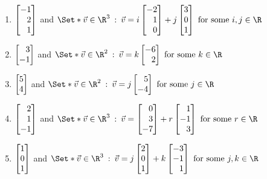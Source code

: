 \begin{exercises}
\begin{problist}
\begin{enumerate}
				\item $\mat{-1 \\ 2 \\ 1}$ and
					$\Set*{\vv\in\R^3\given
						\vv=i\mat{-2 \\ 1 \\ 0} +j\mat{3 \\ 0 \\ 1}
						\text{ for some }i,j\in\R
					}$
					\item
						$\mat{3 \\ -1}$ and $\Set*{ \vv\in\R^2\given
							\vv=k\mat{-6 \\ 2}\text{ for some } k\in\R
						}$
					\item
						$\mat{5 \\ 4}$ and
						$\Set*{\vv\in\R^2\given
							\vv=j\mat{5 \\ -4}\text{ for some }j\in\R
						}$
					\item $\mat{2 \\ 1 \\ -1}$ and
						$\Set*{\vv\in\R^3
							\given \vv= \mat{0 \\ 3 \\ -7} +r\mat{1 \\ -1 \\ 3}
							\text{ for some }r\in\R
						}$
					\item $\mat{1 \\ 0 \\ 1}$ and
						$\Set*{\vv\in\R^3\given
							\vv= j\mat{2 \\ 0 \\ 1} +k\mat{-3 \\ -1 \\ 1}
							\text{ for some }j,k\in\R
						}$
			\end{enumerate}
	\end{problist}
\end{exercises}
